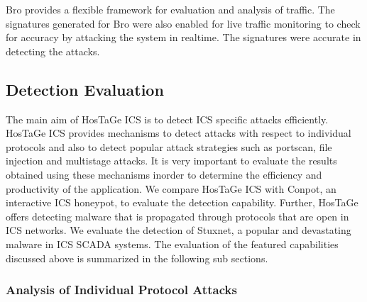 \documentclass[article,msc=informatik,type=msc,colorback,accentcolor=tud9c]{tudthesis}
\begin{document}
 	\vspace{3mm}
  	Bro provides a flexible framework for evaluation and analysis of traffic. The signatures generated for Bro were also enabled for live traffic monitoring to check for accuracy by attacking the system in realtime. The signatures were accurate in detecting the attacks.
 	
 	\subsection{Detection Evaluation}\label{Detection Evaluation}
 	
 	The main aim of HosTaGe ICS is to detect \ac{ICS} specific attacks efficiently. HosTaGe ICS provides mechanisms to detect attacks with respect to individual protocols and also to detect popular attack strategies such as portscan, file injection and multistage attacks. It is very important to evaluate the results obtained using these mechanisms inorder to determine the efficiency and productivity of the application. We compare HosTaGe ICS with Conpot, an interactive \ac{ICS} honeypot, to evaluate the detection capability. Further, HosTaGe offers detecting malware that is propagated through protocols that are open in \ac{ICS} networks. We evaluate the detection of Stuxnet, a popular and devastating malware in \ac{ICS} SCADA systems. The evaluation of the featured capabilities discussed above is summarized in the following sub sections.
 	
 	\subsubsection{Analysis of Individual Protocol Attacks}\label{Analysis of Individual Protocol Attacks}
 	
\end{document}
